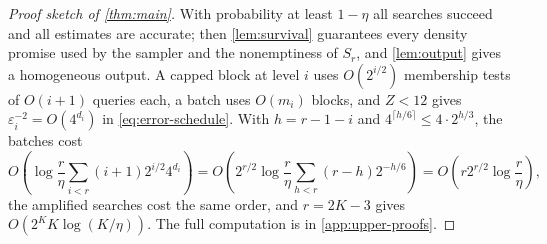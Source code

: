\begin{proof}[Proof sketch of \cref{thm:main}]
With probability at least $1-\eta$ all searches succeed and all estimates
are accurate; then \cref{lem:survival} guarantees every density promise
used by the sampler and the nonemptiness of $S_r$, and \cref{lem:output}
gives a homogeneous output.  A capped block at level $i$ uses $O(2^{i/2})$
membership tests of $O(i+1)$ queries each, a batch uses $O(m_i)$ blocks,
and $Z<12$ gives $\varepsilon_i^{-2}=O(4^{d_i})$ in
\cref{eq:error-schedule}.  With $h=r-1-i$ and
$4^{\lceil h/6\rceil}\le4\cdot2^{h/3}$, the batches cost
\[
 O\!\left(\log\frac r\eta\sum_{i<r}(i+1)2^{i/2}4^{d_i}\right)
 =O\!\left(2^{r/2}\log\frac r\eta\sum_{h<r}(r-h)2^{-h/6}\right)
 =O\!\left(r2^{r/2}\log\frac r\eta\right),
\]
the amplified searches cost the same order, and $r=2K-3$ gives
$O(2^KK\log(K/\eta))$.  The full computation is in \cref{app:upper-proofs}.
\end{proof}

